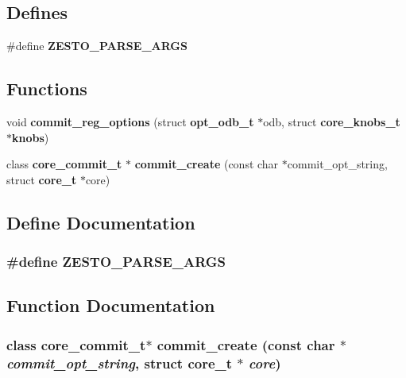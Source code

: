 \subsection*{Defines}
\begin{CompactItemize}
\item 
\#define {\bf ZESTO\_\-PARSE\_\-ARGS}
\end{CompactItemize}
\subsection*{Functions}
\begin{CompactItemize}
\item 
void {\bf commit\_\-reg\_\-options} (struct {\bf opt\_\-odb\_\-t} $\ast$odb, struct {\bf core\_\-knobs\_\-t} $\ast${\bf knobs})
\item 
class {\bf core\_\-commit\_\-t} $\ast$ {\bf commit\_\-create} (const char $\ast$commit\_\-opt\_\-string, struct {\bf core\_\-t} $\ast$core)
\end{CompactItemize}


\subsection{Define Documentation}
\subsubsection[{ZESTO\_\-PARSE\_\-ARGS}]{\setlength{\rightskip}{0pt plus 5cm}\#define ZESTO\_\-PARSE\_\-ARGS}\label{zesto-commit_8cpp_ecd9ec00b3dd5733f280e06811f8bbfc}




\subsection{Function Documentation}
\subsubsection[{commit\_\-create}]{\setlength{\rightskip}{0pt plus 5cm}class {\bf core\_\-commit\_\-t}$\ast$ commit\_\-create (const char $\ast$ {\em commit\_\-opt\_\-string}, \/  struct {\bf core\_\-t} $\ast$ {\em core})}\label{zesto-commit_8cpp_6dec1ee8a7d324bb5e49bd7246608c52}




